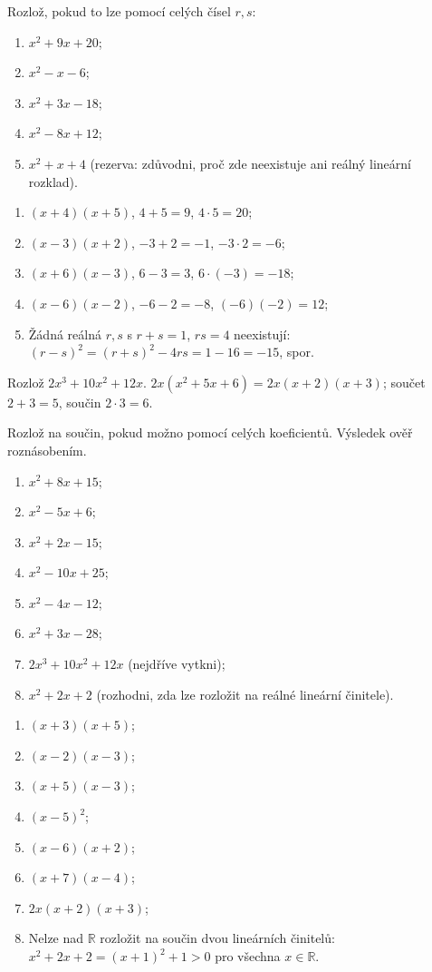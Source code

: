 \documentclass[11pt,a4paper]{article}
\begin{document}
\begin{zadaniReseniBox}[breakable=false,title={Samostatná práce 1}]
Rozlož, pokud to lze pomocí celých čísel $r,s$:
\begin{enumerate}[label=\alph*)]
\item $x^2+9x+20$;
\item $x^2-x-6$;
\item $x^2+3x-18$;
\item $x^2-8x+12$;
\item $x^2+x+4$ (rezerva: zdůvodni, proč zde neexistuje ani reálný lineární rozklad).
\end{enumerate}
\tcblower
\begin{enumerate}[label=\alph*)]
\item $(x+4)(x+5)$, $4+5=9$, $4\cdot5=20$;
\item $(x-3)(x+2)$, $-3+2=-1$, $-3\cdot2=-6$;
\item $(x+6)(x-3)$, $6-3=3$, $6\cdot(-3)=-18$;
\item $(x-6)(x-2)$, $-6-2=-8$, $(-6)(-2)=12$;
\item Žádná reálná $r,s$ s $r+s=1$, $rs=4$ neexistují: $(r-s)^2=(r+s)^2-4rs=1-16=-15$, spor.
\end{enumerate}
\end{zadaniReseniBox}
\begin{zadaniReseniBox}[breakable=false,title={Rozšíření 1}]
Rozlož $2x^3+10x^2+12x$.
\tcblower
$2x(x^2+5x+6)=2x(x+2)(x+3)$; součet $2+3=5$, součin $2\cdot3=6$.
\end{zadaniReseniBox}
\begin{zadaniReseniBox}[breakable=false,title={Domácí úkol}]
Rozlož na součin, pokud možno pomocí celých koeficientů. Výsledek ověř roznásobením.
\begin{enumerate}[label=\alph*)]
\item $x^2+8x+15$;
\item $x^2-5x+6$;
\item $x^2+2x-15$;
\item $x^2-10x+25$;
\item $x^2-4x-12$;
\item $x^2+3x-28$;
\item $2x^3+10x^2+12x$ (nejdříve vytkni);
\item $x^2+2x+2$ (rozhodni, zda lze rozložit na reálné lineární činitele).
\end{enumerate}
\tcblower
\begin{enumerate}[label=\alph*)]
\item $(x+3)(x+5)$;
\item $(x-2)(x-3)$;
\item $(x+5)(x-3)$;
\item $(x-5)^2$;
\item $(x-6)(x+2)$;
\item $(x+7)(x-4)$;
\item $2x(x+2)(x+3)$;
\item Nelze nad $\mathbb R$ rozložit na součin dvou lineárních činitelů:
$x^2+2x+2=(x+1)^2+1>0$ pro všechna $x\in\mathbb R$.
\end{enumerate}
\end{zadaniReseniBox}
\end{document}
